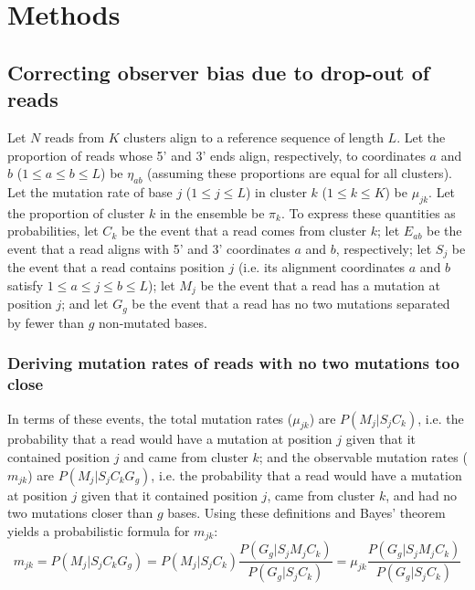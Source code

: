 \documentclass[main.tex]{subfiles}
\begin{document}
\section{Methods}
\label{methods}


\subsection{Correcting observer bias due to drop-out of reads}

Let $N$ reads from $K$ clusters align to a reference sequence of length $L$.
Let the proportion of reads whose 5' and 3' ends align, respectively, to coordinates $a$ and $b$ ($1 \le a \le b \le L$) be $\eta_{ab}$ (assuming these proportions are equal for all clusters). Let the mutation rate of base $j$ ($1 \le j \le L$) in cluster $k$ ($1 \le k \le K$) be $\mu_{jk}$.
Let the proportion of cluster $k$ in the ensemble be $\pi_k$.
To express these quantities as probabilities, let $C_k$ be the event that a read comes from cluster $k$; let $E_{ab}$ be the event that a read aligns with 5' and 3' coordinates $a$ and $b$, respectively; let $S_j$ be the event that a read contains position $j$ (i.e. its alignment coordinates $a$ and $b$ satisfy $1 \le a \le j \le b \le L$); let $M_j$ be the event that a read has a mutation at position $j$; and let $G_g$ be the event that a read has no two mutations separated by fewer than $g$ non-mutated bases.

\subsubsection{Deriving mutation rates of reads with no two mutations too close}
\label{calc_p_mut_noclose}

In terms of these events, the total mutation rates ($\mu_{jk}$) are $P(M_j | S_j C_k)$, i.e. the probability that a read would have a mutation at position $j$ given that it contained position $j$ and came from cluster $k$; and the observable mutation rates ($m_{jk}$) are $P(M_j | S_j C_k G_g)$, i.e. the probability that a read would have a mutation at position $j$ given that it contained position $j$, came from cluster $k$, and had no two mutations closer than $g$ bases.
Using these definitions and Bayes' theorem yields a probabilistic formula for $m_{jk}$:
$$m_{jk} = P(M_j | S_j C_k G_g) = P(M_j | S_j C_k) \frac{P(G_g | S_j M_j C_k)}{P(G_g | S_j C_k)} = \mu_{jk} \frac{P(G_g | S_j M_j C_k)}{P(G_g | S_j C_k)}$$
\end{document}
